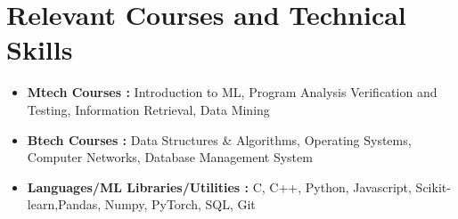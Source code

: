 \documentclass[10.8pt, a4paper]{extarticle}
\newcommand{\shorterSection}[1]{\vspace{-10pt}\section{#1}}
\begin{document}

\shorterSection{Relevant Courses and Technical Skills}
\begin{itemize}
\item \textbf{Mtech Courses :} Introduction to ML, Program Analysis Verification and Testing, Information Retrieval, Data Mining
\item \textbf{Btech Courses :} Data Structures \& Algorithms, Operating Systems, Computer Networks, Database Management System
\item \textbf{Languages/ML Libraries/Utilities :} C, C++, Python, Javascript, Scikit-learn,Pandas, Numpy, PyTorch, SQL, Git
\end{itemize}


\end{document}
